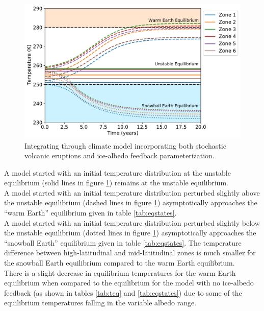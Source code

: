 \documentclass[12pt]{article}
\begin{document}
\begin{figure}[H]
    \centering
    \includegraphics[scale=0.6]{albedo_equilibria_1plot.pdf}
    \caption{
        Integrating through climate model incorporating both stochastic volcanic
        eruptions and ice-albedo feedback parameterization.
    }
    \label{fig:albedo_equil}
\end{figure}
\FloatBarrier

A model started with an initial temperature distribution at the unstable equilibrium
(solid lines in figure \ref{fig:albedo_equil}) remains at the unstable equilibrium. \\

A model started with an initial temperature distribution perturbed slightly above
the unstable equilibrium (dashed lines in figure \ref{fig:albedo_equil}) asymptotically
approaches the ``warm Earth'' equilibrium given in table \ref{tab:eqstates}. \\

A model started with an initial temperature distribution perturbed slightly below
the unstable equilibrium (dotted lines in figure \ref{fig:albedo_equil}) asymptotically
approaches the ``snowball Earth'' equilibrium given in table \ref{tab:eqstates}.
The temperature difference between high-latitudinal and mid-latitudinal zones is much
smaller for the snowball Earth equilibrium compared to the warm Earth equilibrium. \\

There is a slight decrease in equilibrium temperatures
for the warm Earth equilibrium when compared to the equilibrium for the model with
no ice-albedo feedback (as shown in tables \ref{tab:teq} and \ref{tab:eqstates})
due to some of the equilibrium temperatures falling in the variable albedo range. \\
\end{document}
